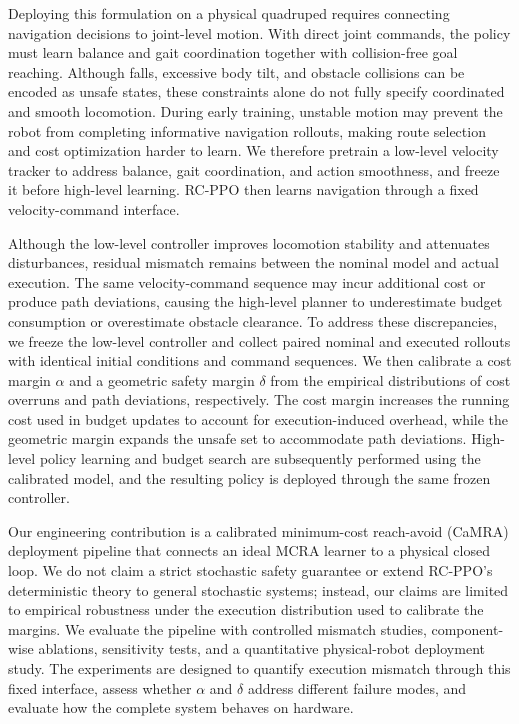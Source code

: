 \documentclass[conference]{IEEEtran}
\begin{document}
Deploying this formulation on a physical quadruped requires connecting navigation
decisions to joint-level motion. With direct joint commands, the policy must learn
balance and gait coordination together with collision-free goal reaching. Although
falls, excessive body tilt, and obstacle collisions can be encoded as unsafe
states, these constraints alone do not fully specify coordinated and smooth
locomotion. During early training, unstable motion may prevent the robot from
completing informative navigation rollouts, making route selection and cost
optimization harder to learn. We therefore pretrain a low-level velocity tracker
to address balance, gait coordination, and action smoothness, and freeze it before
high-level learning. RC-PPO then learns navigation through a fixed velocity-command
interface.

Although the low-level controller improves locomotion stability and attenuates
disturbances, residual mismatch remains between the nominal model and actual
execution. The same velocity-command sequence may incur additional cost or produce
path deviations, causing the high-level planner to underestimate budget
consumption or overestimate obstacle clearance. To address these discrepancies,
we freeze the low-level controller and collect paired nominal and executed
rollouts with identical initial conditions and command sequences. We then
calibrate a cost margin $\alpha$ and a geometric safety margin $\delta$ from the
empirical distributions of cost overruns and path deviations, respectively. The
cost margin increases the running cost used in budget updates to account for
execution-induced overhead, while the geometric margin expands the unsafe set to
accommodate path deviations. High-level policy learning and budget search are
subsequently performed using the calibrated model, and the resulting policy is
deployed through the same frozen controller.

Our engineering contribution is a calibrated minimum-cost reach-avoid (CaMRA)
deployment pipeline that connects an ideal MCRA learner to a physical closed loop. We do not claim a strict
stochastic safety guarantee or extend RC-PPO's deterministic theory to general
stochastic systems; instead, our claims are limited to empirical robustness under
the execution distribution used to calibrate the margins. We evaluate the pipeline
with controlled mismatch studies, component-wise ablations, sensitivity tests, and
a quantitative physical-robot deployment study. The experiments are designed to
quantify execution mismatch through this fixed interface, assess whether
$\alpha$ and $\delta$ address different failure modes, and evaluate how the
complete system behaves on hardware.
\end{document}
